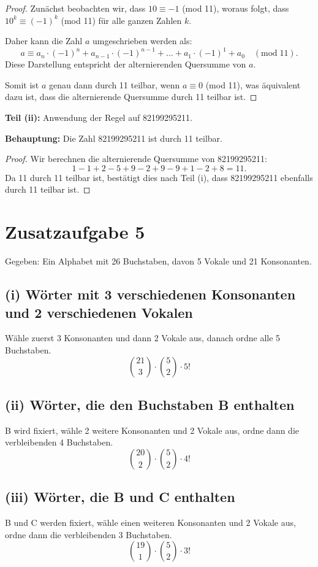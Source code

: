 \documentclass{article}
\begin{document}
\begin{proof}
	Zunächst beobachten wir, dass \( 10 \equiv -1 \) (mod 11), woraus folgt, dass \( 10^k \equiv (-1)^k \) (mod 11) für alle ganzen Zahlen \( k \).

	Daher kann die Zahl \( a \) umgeschrieben werden als:
	\[
		a \equiv a_n \cdot (-1)^n + a_{n-1} \cdot (-1)^{n-1} + \ldots + a_1 \cdot (-1)^1 + a_0 \quad (\text{mod} \; 11).
	\]
	Diese Darstellung entspricht der alternierenden Quersumme von \( a \).

	Somit ist \( a \) genau dann durch 11 teilbar, wenn \( a \equiv 0 \) (mod 11), was äquivalent dazu ist, dass die alternierende Quersumme durch 11 teilbar ist.
\end{proof}

\textbf{Teil (ii):} Anwendung der Regel auf 82199295211.

\textbf{Behauptung:} Die Zahl 82199295211 ist durch 11 teilbar.

\begin{proof}
	Wir berechnen die alternierende Quersumme von 82199295211:
	\[
		1 - 1 + 2 - 5 + 9 - 2 + 9 - 9 + 1 - 2 + 8 = 11.
	\]
	Da 11 durch 11 teilbar ist, bestätigt dies nach Teil (i), dass 82199295211 ebenfalls durch 11 teilbar ist.
\end{proof}

\section*{Zusatzaufgabe 5}

Gegeben: Ein Alphabet mit 26 Buchstaben, davon 5 Vokale und 21 Konsonanten.

\subsection*{(i) Wörter mit 3 verschiedenen Konsonanten und 2 verschiedenen Vokalen}
Wähle zuerst 3 Konsonanten und dann 2 Vokale aus, danach ordne alle 5 Buchstaben.
\[
	\binom{21}{3} \cdot \binom{5}{2} \cdot 5!
\]

\subsection*{(ii) Wörter, die den Buchstaben B enthalten}
B wird fixiert, wähle 2 weitere Konsonanten und 2 Vokale aus, ordne dann die verbleibenden 4 Buchstaben.
\[
	\binom{20}{2} \cdot \binom{5}{2} \cdot 4!
\]

\subsection*{(iii) Wörter, die B und C enthalten}
B und C werden fixiert, wähle einen weiteren Konsonanten und 2 Vokale aus, ordne dann die verbleibenden 3 Buchstaben.
\[
	\binom{19}{1} \cdot \binom{5}{2} \cdot 3!
\]
\end{document}
